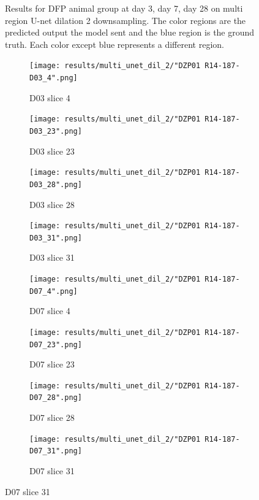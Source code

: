 \begin{figure}[!htb]
  \caption{Results for DFP animal group at day 3, day 7, day 28 on multi region U-net dilation 2 downsampling. The color regions are the predicted output the model sent and the blue region is the ground truth. Each color except blue represents a different region.}
  \label{fig:results_multi_unetdil2_DFP}
\end{figure}




\begin{figure}[!htb]  
    \centering %
\begin{subfigure}{0.25\textwidth}
  \texttt{[image: results/multi\_unet\_dil\_2/"DZP01 R14-187-D03\_4".png]}
  \caption{D03 slice 4}
\end{subfigure}\hfil %
\begin{subfigure}{0.25\textwidth}
  \texttt{[image: results/multi\_unet\_dil\_2/"DZP01 R14-187-D03\_23".png]}
  \caption{D03 slice 23}
\end{subfigure}\hfil %
\begin{subfigure}{0.25\textwidth}
  \texttt{[image: results/multi\_unet\_dil\_2/"DZP01 R14-187-D03\_28".png]}
  \caption{D03 slice 28}
\end{subfigure}\hfil %
\begin{subfigure}{0.25\textwidth}
  \texttt{[image: results/multi\_unet\_dil\_2/"DZP01 R14-187-D03\_31".png]}
  \caption{D03 slice 31}
\end{subfigure}

\medskip
\begin{subfigure}{0.25\textwidth}
  \texttt{[image: results/multi\_unet\_dil\_2/"DZP01 R14-187-D07\_4".png]}
  \caption{D07 slice 4}
\end{subfigure}\hfil %
\begin{subfigure}{0.25\textwidth}
  \texttt{[image: results/multi\_unet\_dil\_2/"DZP01 R14-187-D07\_23".png]}
  \caption{D07 slice 23}
\end{subfigure}\hfil %
\begin{subfigure}{0.25\textwidth}
  \texttt{[image: results/multi\_unet\_dil\_2/"DZP01 R14-187-D07\_28".png]}
  \caption{D07 slice 28}
\end{subfigure}\hfil %
\begin{subfigure}{0.25\textwidth}
  \texttt{[image: results/multi\_unet\_dil\_2/"DZP01 R14-187-D07\_31".png]}
  \caption{D07 slice 31}
\end{subfigure}


\end{figure}
